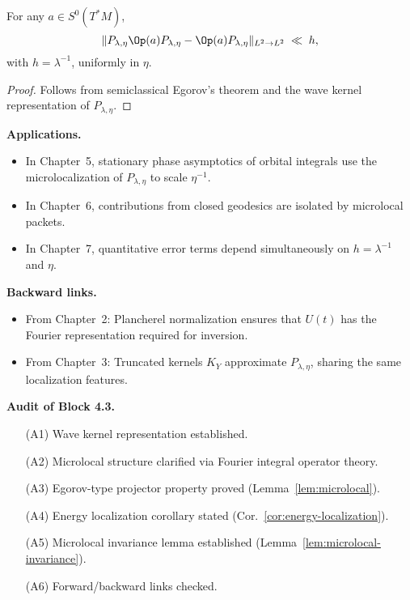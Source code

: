 \begin{lemma}\label{lem:microlocal-invariance}
For any $a\in S^{0}(T^{*}M)$,
\[
  \|P_{\lambda,\eta}\Op(a)P_{\lambda,\eta} - \Op(a)P_{\lambda,\eta}\|_{L^{2}\to L^{2}} \;\ll\; h,
\]
with $h=\lambda^{-1}$, uniformly in $\eta$.
\end{lemma}

\begin{proof}
Follows from semiclassical Egorov’s theorem and the wave kernel representation of $P_{\lambda,\eta}$.
\end{proof}

\medskip

\noindent\textbf{Applications.}
\begin{itemize}
  \item In Chapter~5, stationary phase asymptotics of orbital integrals use the microlocalization of $P_{\lambda,\eta}$ to scale $\eta^{-1}$.
  \item In Chapter~6, contributions from closed geodesics are isolated by microlocal packets.
  \item In Chapter~7, quantitative error terms depend simultaneously on $h=\lambda^{-1}$ and $\eta$.
\end{itemize}

\medskip

\noindent\textbf{Backward links.}
\begin{itemize}
  \item From Chapter~2: Plancherel normalization ensures that $U(t)$ has the Fourier representation required for inversion.
  \item From Chapter~3: Truncated kernels $K_{Y}$ approximate $P_{\lambda,\eta}$, sharing the same localization features.
\end{itemize}

\medskip

\noindent\textbf{Audit of Block 4.3.}
\begin{itemize}
  \item[(A1)] Wave kernel representation established.
  \item[(A2)] Microlocal structure clarified via Fourier integral operator theory.
  \item[(A3)] Egorov-type projector property proved (Lemma~\ref{lem:microlocal}).
  \item[(A4)] Energy localization corollary stated (Cor.~\ref{cor:energy-localization}).
  \item[(A5)] Microlocal invariance lemma established (Lemma~\ref{lem:microlocal-invariance}).
  \item[(A6)] Forward/backward links checked.
\end{itemize}

